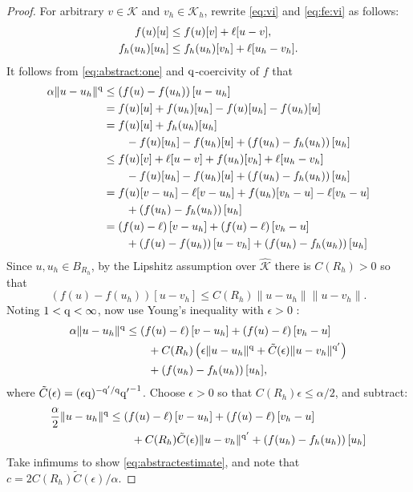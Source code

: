 \documentclass[hidelinks,onefignum,onetabnum,final]{siamart220329}  %
\newcommand{\eps}{\epsilon}
\newcommand{\cK}{\mathcal{K}}
\newcommand{\hcK}{\widehat{\cK}}
\newcommand{\qq}{{\text{\textnormal{q}}}}
\begin{document}
\begin{proof}  For arbitrary $v\in\cK$ and $v_h\in\cK_h$, rewrite \eqref{eq:vi} and \eqref{eq:fe:vi} as follows:
\begin{align}
f(u)[u]     &\le f(u)[v] + \ell[u-v], \label{eq:abstract:one}  \\
f_h(u_h)[u_h] &\le f_h(u_h)[v_h] + \ell[u_h-v_h]. \notag
\end{align}
It follows from \eqref{eq:abstract:one} and $\qq$-coercivity of $f$ that
\begin{align}
\alpha \|u-u_h\|^\qq &\le \left(f(u)-f(u_h)\right)[u-u_h] \label{eq:abstract:two} \\
  &= f(u)[u] + f(u_h)[u_h] - f(u)[u_h] - f(u_h)[u] \notag \\
  &= f(u)[u] + f_h(u_h)[u_h] \notag \\
  &\qquad - f(u)[u_h] - f(u_h)[u] + \left(f(u_h)-f_h(u_h)\right)[u_h] \notag \\
  &\le f(u)[v] + \ell[u-v] + f(u_h)[v_h] + \ell[u_h-v_h] \notag \\
  &\qquad - f(u)[u_h] - f(u_h)[u] + \left(f(u_h)-f_h(u_h)\right)[u_h] \notag \\
  &= f(u)[v-u_h] - \ell[v-u_h] + f(u_h)[v_h-u] - \ell[v_h-u] \notag \\
  &\qquad + \left(f(u_h)-f_h(u_h)\right)[u_h] \notag \\
  &= \left(f(u)-\ell\right)[v-u_h] + \left(f(u)-\ell\right)[v_h-u] \notag \\
  &\qquad + \left(f(u)-f(u_h)\right)[u-v_h] + \left(f(u_h)-f_h(u_h)\right)[u_h] \notag
\end{align}
Since $u,u_h\in B_{R_h}$, by the Lipshitz assumption over $\hcK$ there is $C(R_h)>0$ so that
\begin{equation}
\left(f(u)-f(u_h)\right)[u-v_h] \le C(R_h) \|u-u_h\|\|u-v_h\|. \label{eq:abstract:three}
\end{equation}
Noting $1<\qq<\infty$, now use Young's inequality with $\eps>0$ \cite[Appendix B.2]{Evans2010}:
\begin{align}
\alpha \|u-u_h\|^\qq &\le \left(f(u)-\ell\right)[v-u_h] + \left(f(u)-\ell\right)[v_h-u]  \label{eq:abstract:four} \\
  &\qquad + C(R_h) \left(\eps\|u-u_h\|^\qq + \tilde C(\eps) \|u-v_h\|^{\qq'}\right) \notag \\
  &\qquad + \left(f(u_h)-f_h(u_h)\right)[u_h], \notag
\end{align}
where $\tilde C(\eps) = (\eps \qq)^{-\qq'/\qq} {\qq'}^{-1}$.  Choose $\eps>0$ so that $C(R_h) \eps \le \alpha/2$, and subtract:
\begin{align}
\frac{\alpha}{2} \|u-u_h\|^\qq &\le \left(f(u)-\ell\right)[v-u_h] + \left(f(u)-\ell\right)[v_h-u]  \label{eq:abstract:five} \\
  &\qquad + C(R_h) \tilde C(\eps) \|u-v_h\|^{\qq'} + \left(f(u_h)-f_h(u_h)\right)[u_h] \notag
\end{align}
Take infimums to show \eqref{eq:abstractestimate}, and note that $c=2 C(R_h) \tilde C(\eps)/\alpha$.
\end{proof}
\end{document}
